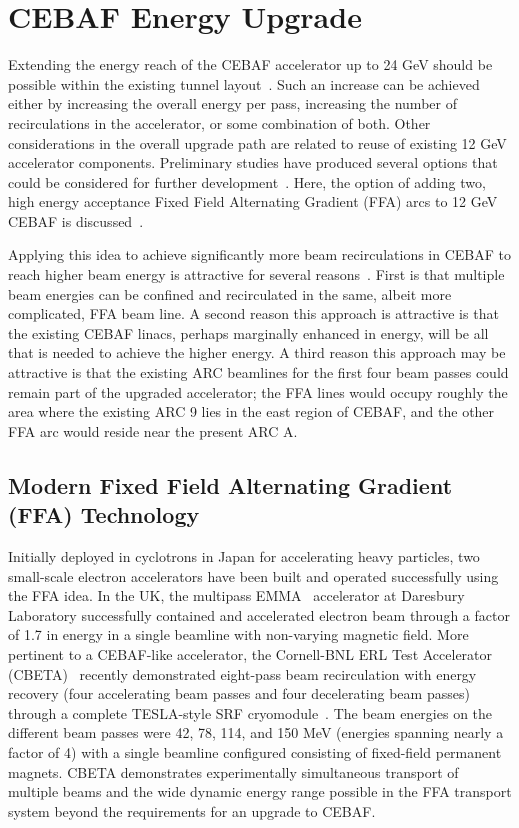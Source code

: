 \section{CEBAF Energy Upgrade}
\label{sec:appendixc}

Extending the energy reach of the CEBAF accelerator up to 24 GeV should be possible within the existing tunnel layout~\cite{harwood:2001, leemann1}. Such an increase can be achieved either by increasing the overall energy per pass, increasing the number of recirculations in the accelerator, or some combination of both. Other considerations in the overall upgrade path are related to reuse of existing 12 GeV accelerator components. Preliminary studies have produced several options that could be considered for further development~\cite{mckeown:2020}. Here, the option of adding two, high energy acceptance Fixed Field Alternating Gradient (FFA) arcs to 12 GeV CEBAF is discussed~\cite {IPAC21:2018bde}.

Applying this idea to achieve significantly more beam recirculations in CEBAF to reach higher beam energy is attractive for several reasons~\cite{mckeown:2020}. First is that multiple beam energies can be confined and recirculated in the same, albeit more complicated, FFA beam line. A second reason this approach is attractive is that the existing CEBAF linacs, perhaps marginally enhanced in energy, will be all that is needed to achieve the higher energy. A third reason this approach may be attractive is that the existing ARC beamlines for the first four beam passes could remain part of the upgraded accelerator; the FFA lines would occupy roughly the area where the existing ARC 9 lies in the east region of CEBAF, and the other FFA arc would reside near the present ARC A.



\subsection{Modern Fixed Field Alternating Gradient (FFA) Technology }
 
 Initially deployed in cyclotrons in Japan for accelerating heavy particles, two small-scale electron accelerators have been built and operated successfully using the FFA idea. In the UK, the multipass EMMA~\cite{machida:2012} accelerator at Daresbury Laboratory successfully contained and accelerated electron beam through a factor of 1.7 in energy in a single beamline with non-varying magnetic field. More pertinent to a CEBAF-like accelerator, the Cornell-BNL ERL Test Accelerator (CBETA)~\cite{CBETA-DR:2018bde} recently demonstrated eight-pass beam recirculation with energy recovery (four accelerating beam passes and four decelerating beam passes) through a complete TESLA-style SRF
cryomodule~\cite{CBETA-PRL:2018bde}. The beam energies on the different beam passes were 42, 78, 114, and 150 MeV (energies spanning nearly a factor of 4) with a single beamline configured consisting of fixed-field permanent magnets. CBETA demonstrates experimentally simultaneous transport of multiple  beams and the wide dynamic energy range possible in the FFA transport system beyond the requirements for an upgrade to CEBAF.
 
